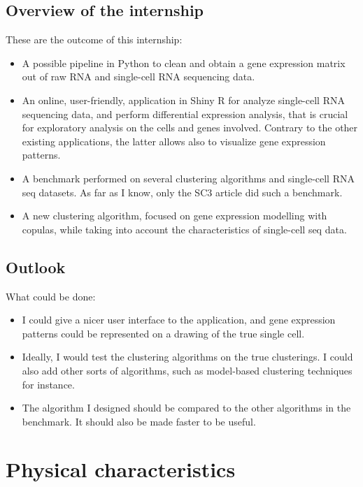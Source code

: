 \documentclass{report}
\begin{document}
{\section{Overview of the internship}

These are the outcome of this internship:
\begin{itemize}
\item A possible pipeline in Python to clean and obtain a gene expression matrix out of raw RNA and single-cell RNA sequencing data.
\item An online, user-friendly, application in Shiny R for analyze single-cell RNA sequencing data, and perform differential expression analysis, that is crucial for exploratory analysis on the cells and genes involved. Contrary to the other existing applications, the latter allows also to visualize gene expression patterns.
\item A benchmark performed on several clustering algorithms and single-cell RNA seq datasets. As far as I know, only the SC3 article did such a benchmark.
\item A new clustering algorithm, focused on gene expression modelling with copulas, while taking into account the characteristics of single-cell seq data.
\end{itemize}

\section{Outlook}

What could be done:
\begin{itemize}
\item I could give a nicer user interface to the application, and gene expression patterns could be represented on a drawing of the true single cell.
\item Ideally, I would test the clustering algorithms on the true clusterings. I could also add other sorts of algorithms, such as model-based clustering techniques for instance.
\item The algorithm I designed should be compared to the other algorithms in the benchmark. It should also be made faster to be useful.
\end{itemize}

\newpage




\newpage

\appendix

\chapter{Physical characteristics}

}
\end{document}
